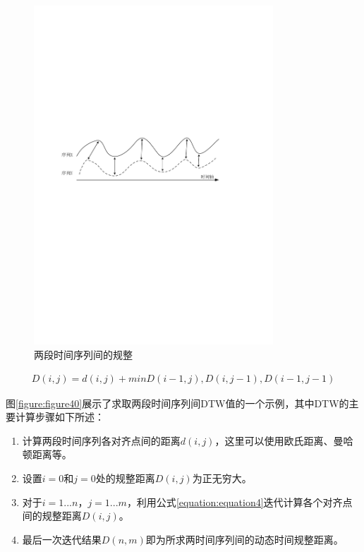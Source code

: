 \begin{figure}[htbp]
    \centering
    \includegraphics[width=0.8\textwidth]{figures/dtw.pdf}
    \caption{两段时间序列间的规整}\label{figure:figure39}
\end{figure}
\vspace{-1em}
\begin{equation}
    \label{equation:equation4}
    \begin{aligned}
        D(i,j) = d(i,j) + min{D(i-1,j),D(i,j-1),D(i-1,j-1)}
    \end{aligned}
\end{equation}

图\ref{figure:figure40}展示了求取两段时间序列间DTW值的一个示例，其中DTW的主要计算步骤如下所述：
\begin{enumerate}
  \item 计算两段时间序列各对齐点间的距离$d(i,j)$，这里可以使用欧氏距离、曼哈顿距离等。
  \item 设置$i = 0$和$j = 0$处的规整距离$D(i,j)$为正无穷大。
  \item 对于$i = 1 ... n$，$j = 1 ... m$，利用公式\ref{equation:equation4}迭代计算各个对齐点间的规整距离$D(i,j)$。
  \item 最后一次迭代结果$D(n,m)$即为所求两时间序列间的动态时间规整距离。
\end{enumerate}

